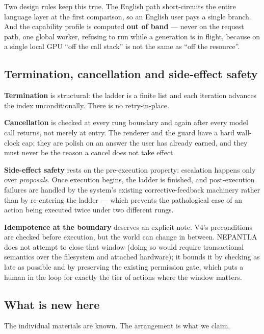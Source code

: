 Two design rules keep this true. The English path short-circuits the entire
language layer at the first comparison, so an English user pays a single branch.
And the capability profile is computed \textbf{out of band} --- never on the
request path, one global worker, refusing to run while a generation is in
flight, because on a single local GPU ``off the call stack'' is not the same as
``off the resource''.

\subsection{Termination, cancellation and side-effect safety}
\label{sec:termination-cancellation}

\textbf{Termination} is structural: the ladder is a finite list and each
iteration advances the index unconditionally. There is no retry-in-place.

\textbf{Cancellation} is checked at every rung boundary and again after every
model call returns, not merely at entry. The renderer and the guard have a hard
wall-clock cap; they are polish on an answer the user has already earned, and
they must never be the reason a cancel does not take effect.

\textbf{Side-effect safety} rests on the pre-execution property: escalation
happens only over \emph{proposals}. Once execution begins, the ladder is
finished, and post-execution failures are handled by the system's existing
corrective-feedback machinery rather than by re-entering the ladder --- which
prevents the pathological case of an action being executed twice under two
different rungs.

\textbf{Idempotence at the boundary} deserves an explicit note. V4's
preconditions are checked before execution, but the world can change in between.
NEPANTLA does not attempt to close that window (doing so would require
transactional semantics over the filesystem and attached hardware); it bounds it
by checking as late as possible and by preserving the existing permission gate,
which puts a human in the loop for exactly the tier of actions where the window
matters.

\subsection{What is new here}
\label{sec:what-is-new}

The individual materials are known. The arrangement is what we claim.

